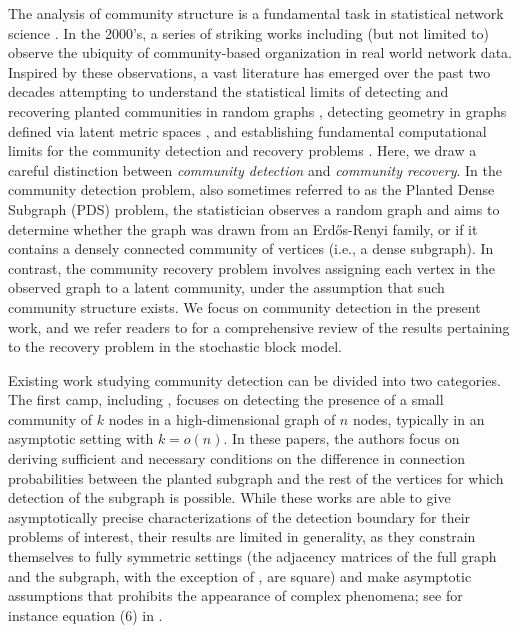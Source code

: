 \documentclass{article}
\begin{document}
The analysis of community structure is a fundamental task in statistical network science \cite{fortunato202220, dey2022community}. 
In the 2000's, a series of striking works including (but not limited to) \cite{albert2002statistical,barabasi2004network,girvan2002community, palla2005uncovering, rosvall2008maps} observe the ubiquity of community-based organization in real world network data. 
Inspired by these observations, a vast literature has emerged over the past two decades attempting to understand the statistical limits of detecting and recovering planted communities in random graphs \cite{coja2010graph, massoulie2014community, mossel2014belief, verzelen2015community, arias2014community, banks2016information, mossel2018proof},  detecting geometry in graphs defined via latent metric spaces \cite{bubeck2016testing, brennan2020phase, liu2023phase, duchemin2023random}, and establishing fundamental computational limits for the community detection and recovery problems \cite{hajek2015computational, chen2016statistical, wu2018statistical, ma2015computational, brennan2018reducibility}. 
Here, we draw a careful distinction between \textit{community detection} and \textit{community recovery}. 
In the community detection problem, also sometimes referred to as the Planted Dense Subgraph (PDS) problem, the statistician observes a random graph and aims to determine whether the graph was drawn from an Erd\H{o}s-Renyi family, or if it contains a densely connected community of vertices (i.e., a dense subgraph). In contrast, the community recovery problem involves assigning each vertex in the observed graph to a latent community, under the assumption that such community structure exists. We focus on community detection in the present work, and we refer readers to \cite{abbe2018community} for a comprehensive review of the results pertaining to the recovery problem in the stochastic block model.

Existing work studying community detection can be divided into two categories. The first camp, including \cite{arias2014community, verzelen2015community, rotenberg2024planted, yuan2022sharp}, focuses on detecting the presence of a small community of $k$ nodes in a high-dimensional graph of $n$ nodes, typically in an asymptotic setting with $k = o(n)$. In these papers, the authors focus on deriving sufficient and necessary conditions on the difference in connection probabilities between the planted subgraph and the rest of the vertices for which detection of the subgraph is possible. While these works are able to give asymptotically precise characterizations of the detection boundary for their problems of interest, their results are limited in generality, as they constrain themselves to fully symmetric settings (the adjacency matrices of the full graph and the subgraph, with the exception of \cite{rotenberg2024planted}, are square) and make asymptotic assumptions that prohibits the appearance of complex phenomena; see for instance equation (6) in \cite{arias2014community}.
\end{document}

